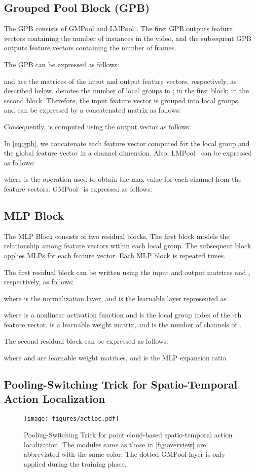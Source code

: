 \documentclass[10pt,twocolumn,letterpaper]{article}
\begin{document}
\subsection{Grouped Pool Block (GPB)}
The GPB consists of GMPool  and LMPool .
The first GPB outputs feature vectors containing the number of instances in the video, and the subsequent GPB outputs feature vectors containing the number of frames.

The GPB can be expressed as follows:

 and  are the matrices of the input and output feature vectors, respectively, as described below.
 denotes the number of local groups in ;  in the first block;  in the second block.
Therefore, the input feature vector  is grouped into  local groups, and  can be expressed by a concatenated matrix as follows:

Consequently,  is computed using the output vector  as follows:

In \cref{eq:gpb}, we concatenate each feature vector  computed for the local group  and the global feature vector  in a channel dimension.
Also, LMPool~ can be expressed as follows:

where  is the operation used to obtain the max value for each channel from the feature vectors.
GMPool~ is expressed as follows:



\subsection{MLP Block}
The MLP Block consists of two residual blocks.
The first block models the relationship among feature vectors within each local group.
The subsequent block applies MLPs for each feature vector.
Each MLP block is repeated  times.

The first residual block can be written using the input and output matrices  and , respectively, as follows:

where  is the normalization layer, and  is the learnable layer represented as

where  is a nonlinear activation function and  is the local group index of the -th feature vector.
 is a learnable weight matrix, and  is the number of channels of .

The second residual block can be expressed as follows:

where  and  are learnable weight matrices, and  is the MLP expansion ratio.

\subsection{Pooling-Switching Trick for Spatio-Temporal Action Localization}
\begin{figure}[tb]
  \centering
  \texttt{[image: figures/actloc.pdf]}
  \caption{Pooling-Switching Trick for point cloud-based spatio-temporal action localization.
  The modules same as those in \cref{fig:overview} are abbreviated with the same color.
  The dotted GMPool layer is only applied during the training phase.}
  \label{fig:actloc}
\end{figure}
\end{document}
